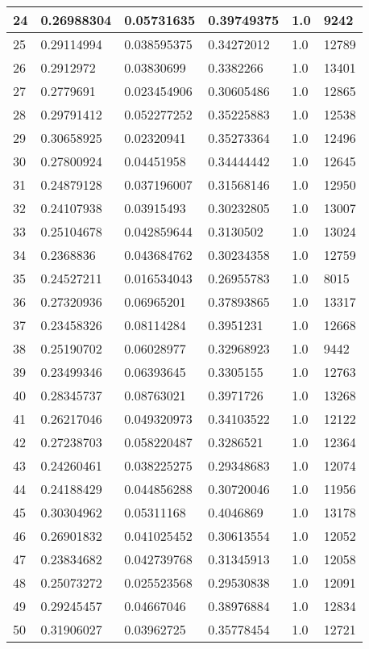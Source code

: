\begin{longtable}{|l|l|l|l|l|l|}
24 & 0.26988304 & 0.05731635 & 0.39749375 & 1.0 & 9242 \\ \hline 
25 & 0.29114994 & 0.038595375 & 0.34272012 & 1.0 & 12789 \\ \hline 
26 & 0.2912972 & 0.03830699 & 0.3382266 & 1.0 & 13401 \\ \hline 
27 & 0.2779691 & 0.023454906 & 0.30605486 & 1.0 & 12865 \\ \hline 
28 & 0.29791412 & 0.052277252 & 0.35225883 & 1.0 & 12538 \\ \hline 
29 & 0.30658925 & 0.02320941 & 0.35273364 & 1.0 & 12496 \\ \hline 
30 & 0.27800924 & 0.04451958 & 0.34444442 & 1.0 & 12645 \\ \hline 
31 & 0.24879128 & 0.037196007 & 0.31568146 & 1.0 & 12950 \\ \hline 
32 & 0.24107938 & 0.03915493 & 0.30232805 & 1.0 & 13007 \\ \hline 
33 & 0.25104678 & 0.042859644 & 0.3130502 & 1.0 & 13024 \\ \hline 
34 & 0.2368836 & 0.043684762 & 0.30234358 & 1.0 & 12759 \\ \hline 
35 & 0.24527211 & 0.016534043 & 0.26955783 & 1.0 & 8015 \\ \hline 
36 & 0.27320936 & 0.06965201 & 0.37893865 & 1.0 & 13317 \\ \hline 
37 & 0.23458326 & 0.08114284 & 0.3951231 & 1.0 & 12668 \\ \hline 
38 & 0.25190702 & 0.06028977 & 0.32968923 & 1.0 & 9442 \\ \hline 
39 & 0.23499346 & 0.06393645 & 0.3305155 & 1.0 & 12763 \\ \hline 
40 & 0.28345737 & 0.08763021 & 0.3971726 & 1.0 & 13268 \\ \hline 
41 & 0.26217046 & 0.049320973 & 0.34103522 & 1.0 & 12122 \\ \hline 
42 & 0.27238703 & 0.058220487 & 0.3286521 & 1.0 & 12364 \\ \hline 
43 & 0.24260461 & 0.038225275 & 0.29348683 & 1.0 & 12074 \\ \hline 
44 & 0.24188429 & 0.044856288 & 0.30720046 & 1.0 & 11956 \\ \hline 
45 & 0.30304962 & 0.05311168 & 0.4046869 & 1.0 & 13178 \\ \hline 
46 & 0.26901832 & 0.041025452 & 0.30613554 & 1.0 & 12052 \\ \hline 
47 & 0.23834682 & 0.042739768 & 0.31345913 & 1.0 & 12058 \\ \hline 
48 & 0.25073272 & 0.025523568 & 0.29530838 & 1.0 & 12091 \\ \hline 
49 & 0.29245457 & 0.04667046 & 0.38976884 & 1.0 & 12834 \\ \hline 
50 & 0.31906027 & 0.03962725 & 0.35778454 & 1.0 & 12721 \\ \hline 
\end{longtable}
